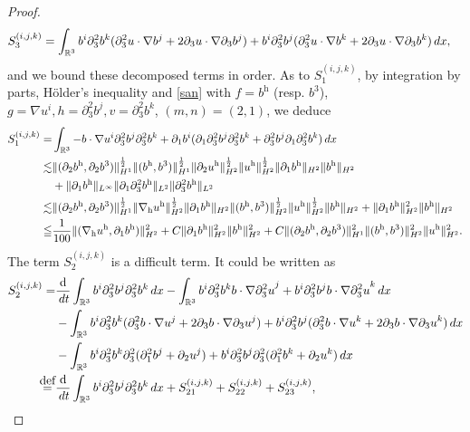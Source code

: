 \documentclass[10pt,a4paper]{amsart}
\newcommand{\R}{\mathbb{R}}
\newcommand{\dt}{\,{\rm d}t}
\newcommand{\dx}{\,{\rm d}x}
\def\eqdefa{\buildrel\hbox{\footnotesize def}\over =}
\newcommand{\h}{\mathrm{h}}
\newcommand{\nablah}{\nabla_{\mathrm{h}}}
\begin{document}
\begin{proof}
\begin{align*}
		S^{(i,j,k)}_3&=\int_{\R^3} b^i\partial_3^2b^k(\partial_3^2u\cdot\nabla{b}^j+2\partial_3u\cdot\nabla\partial_3{b}^j)+b^i\partial_3^2b^j(\partial_3^2u\cdot\nabla{b}^k+2\partial_3u\cdot\nabla\partial_3{b}^k)\dx,
	\end{align*}
	and we bound these decomposed terms in order. As to $S^{(i,j,k)}_1$, by integration by parts, H\"older's inequality and \eqref{san} with $f=b^\h$ (resp. $b^3$), $g=\nabla{u}^i,h=\partial_3^2b^j,v=\partial_3^2b^k$, $(m,n)=(2,1)$, we deduce
	\begin{align}\label{S1}
		S^{(i,j,k)}_1=&\int_{\R^3}-b\cdot\nabla{u}^i\partial_3^2b^j\partial_3^2b^k+ \partial_1b^i(\partial_1\partial_3^2b^j\partial_3^2b^k+\partial_3^2b^j\partial_1\partial_3^2b^k) \dx\nonumber\\
		\lesssim&\|(\partial_2b^\h,\partial_2b^3)\|_{H^1}^\frac12\|(b^\h,b^3)\|_{H^1}^\frac12\|\partial_2u^\h\|_{H^2}^\frac12\|u^\h\|_{H^2}^\frac12\|\partial_1b^\h\|_{H^2}\|b^\h\|_{H^2}\nonumber\\
		&+\|\partial_1b^\h\|_{L^\infty}\|\partial_1\partial_3^2b^\h\|_{L^2}\|\partial_3^2b^\h\|_{L^2}\nonumber\\
		\lesssim&\|(\partial_2b^\h,\partial_2b^3)\|_{H^1}^\frac12\|\nablah u^\h\|_{H^2}^\frac12\|\partial_1b^\h\|_{H^2}\|(b^\h,b^3)\|_{H^2}^\frac12\|u^\h\|_{H^2}^\frac12\|b^\h\|_{H^2}+\|\partial_1b^\h\|_{H^2}^2\|b^\h\|_{H^2}\nonumber\\
		\leqq &\frac{1}{100}\|(\nablah u^\h,\partial_1b^\h)\|_{H^2}^2+C\|\partial_1b^\h\|_{H^2}^2\|b^\h\|_{H^2}^2+C\|(\partial_2b^\h,\partial_2b^3)\|_{H^1}^2\|(b^\h,b^3)\|_{H^2}^2\|u^\h\|_{H^2}^2.
	\end{align}
	The term $S^{(i,j,k)}_2$ is a difficult term. It could be written as
	\begin{align*}
		S^{(i,j,k)}_2=&\frac{\mathrm{d}}{\dt}\int_{\R^3} b^i\partial_3^2b^j\partial_3^2b^k\dx-\int_{\R^3} b^i\partial_3^2b^k b\cdot\nabla{\partial_3^2u}^j+b^i\partial_3^2b^jb\cdot\nabla{\partial_3^2u}^k\dx\\
		&-\int_{\R^3} b^i\partial_3^2b^k(\partial_3^2 b\cdot\nabla{u}^j+2\partial_3 b\cdot\nabla{\partial_3u}^j)+b^i\partial_3^2b^j(\partial_3^2b\cdot\nabla{u}^k+2\partial_3b\cdot\nabla{\partial_3u}^k)\dx\\
		&-\int_{\R^3} b^i\partial_3^2b^k\partial_3^2(\partial_1^2b^j +\partial_2u^j)+ b^i\partial_3^2b^j\partial_3^2(\partial_1^2b^k +\partial_2u^k)\dx\\
		\eqdefa&\frac{\mathrm{d}}{\dt}\int_{\R^3} b^i\partial_3^2b^j\partial_3^2b^k\dx+S^{(i,j,k)}_{21}+S^{(i,j,k)}_{22}+S^{(i,j,k)}_{23},

\end{align*}
\end{proof}
\end{document}
